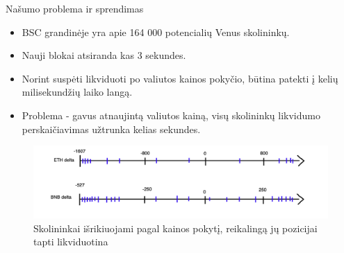 \documentclass[12pt]{beamer}
\begin{document}




\begin{frame}{Našumo problema ir sprendimas}
  \begin{itemize}
    \item BSC grandinėje yra apie 164 000 potencialių Venus skolininkų.
    \item Nauji blokai atsiranda kas 3 sekundes.
    \item Norint suspėti likviduoti po valiutos kainos pokyčio, būtina patekti į kelių milisekundžių laiko langą.
    \item Problema - gavus atnaujintą valiutos kainą, visų skolininkų likvidumo perskaičiavimas užtrunka kelias sekundes.
  \end{itemize}

  \begin{figure}[H]
    \centering
    \includegraphics[scale=0.28]{resources/zerocent.png}
    \caption{Skolininkai išrikiuojami pagal kainos pokytį, reikalingą jų pozicijai tapti likviduotina}
    \label{img:zerocent}
  \end{figure}
\end{frame}
\end{document}
